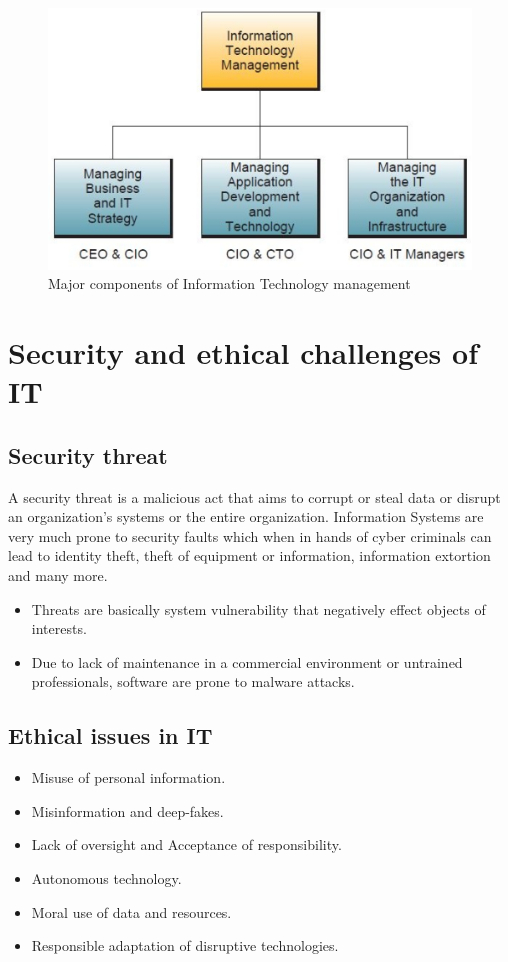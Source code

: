 \documentclass[12pt, a4paper]{article}
\begin{document}
\begin{figure}[h]
  \centering
  \includegraphics[scale=0.5]{majcompofinfotech}
  \caption{Major components of Information Technology management}
  \label{majcompofinfotech}
\end{figure}%

\section{Security and ethical challenges of IT}
\subsection{Security threat}%
A security threat is a malicious act that aims to corrupt or steal data or
disrupt an organization's systems or the entire organization. Information 
Systems are very much prone to security faults which when in hands of cyber
criminals can lead to identity theft, theft of equipment or information, 
information extortion and many more.
\begin{itemize}
  \item Threats are basically system vulnerability that negatively effect
    objects of interests.
  \item Due to lack of maintenance in a commercial environment or untrained
    professionals, software are prone to malware attacks.
\end{itemize}%

\subsection{Ethical issues in IT}%
\begin{itemize}
  \item Misuse of personal information.
  \item Misinformation and deep-fakes.
  \item Lack of oversight and Acceptance of responsibility.
  \item Autonomous technology.
  \item Moral use of data and resources.
  \item Responsible adaptation of disruptive technologies.
\end{itemize}%
\end{document}

